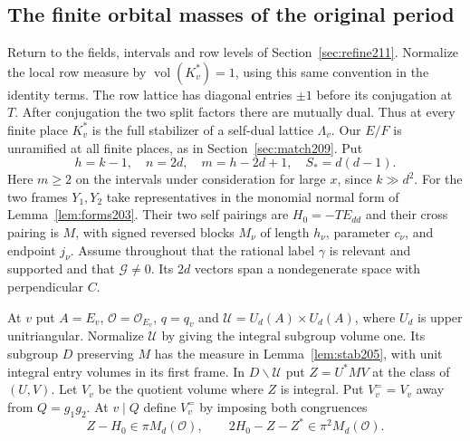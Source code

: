 \documentclass[a4paper,11pt]{article}
\theoremstyle{definition}
\theoremstyle{remark}
\numberwithin{equation}{section}
\begin{document}
\subsection{The finite orbital masses of the original period}\label{nav:IX-08}
\label{sec:flags215}

Return to the fields, intervals and row levels of
Section~\ref{sec:refine211}. Normalize the local row measure by
\(\operatorname{vol}(K_v^*)=1\), using this same convention in
the identity terms. The row lattice has diagonal entries
\(\pm1\) before its conjugation at \(T\). After conjugation the
two split factors there are mutually dual. Thus at every finite
place \(K_v^*\) is the full stabilizer of a self-dual lattice
\(\Lambda_v\). Our \(E/F\) is unramified at all finite places,
as in Section~\ref{sec:match209}. Put
\[
 h=k-1,\quad n=2d,\quad m=h-2d+1,\quad S_*=d(d-1).
\]
Here \(m\ge2\) on the intervals under consideration for large
\(x\), since \(k\gg d^2\).
For the two frames \(Y_1,Y_2\) take representatives in the
monomial normal form of Lemma~\ref{lem:forms203}. Their two
self pairings are \(H_0=-TE_{dd}\) and their cross pairing is
\(M\), with signed reversed blocks \(M_\nu\) of length
\(h_\nu\), parameter \(c_\nu\), and endpoint \(j_\nu\).
Assume throughout that the rational label \(\gamma\) is relevant
and supported and that \(\mathcal G\ne0\). Its \(2d\) vectors
span a nondegenerate space with perpendicular \(C\).

At \(v\) put \(A=E_v\), \(\mathcal O=\mathcal O_{E_v}\),
\(q=q_v\) and \(\mathcal U=U_d(A)\times U_d(A)\), where \(U_d\)
is upper unitriangular. Normalize \(\mathcal U\) by giving the
integral subgroup volume one. Its subgroup \(D\) preserving \(M\)
has the measure in Lemma~\ref{lem:stab205}, with unit integral
entry volumes in its first frame. In \(D\backslash\mathcal U\)
put \(Z=U^*MV\) at the class of \((U,V)\). Let \(V_v\) be the
quotient volume where \(Z\) is integral. Put \(V_v^{=}=V_v\)
away from \(Q=g_1g_2\). At \(v\mid Q\) define \(V_v^{=}\)
by imposing both congruences
\begin{equation}
   Z-H_0\in\pi M_d(\mathcal O),\qquad
   2H_0-Z-Z^*\in\pi^2 M_d(\mathcal O).
   \label{eq:marked215}
\end{equation}
\end{document}
